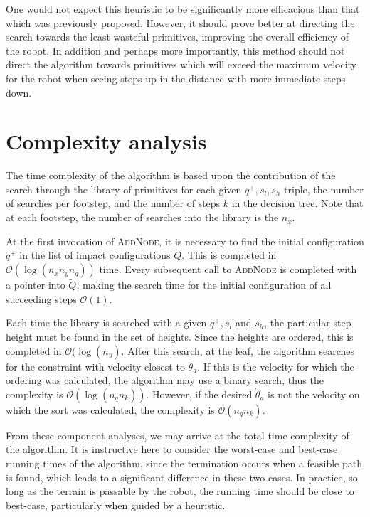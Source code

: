 One would not expect this heuristic to be significantly more efficacious than that which was previously proposed. However, it should prove better at directing the search towards the least wasteful primitives, improving the overall efficiency of the robot. In addition and perhaps more importantly, this method should not direct the algorithm towards primitives which will exceed the maximum velocity for the robot when seeing steps up in the distance with more immediate steps down.

\section{Complexity analysis}
The time complexity of the algorithm is based upon the contribution of the search through the library of primitives for each given $q^+,s_l,s_h$ triple, the number of searches per footstep, and the number of steps $k$ in the decision tree. Note that at each footstep, the number of searches into the library is the $n_x$.

At the first invocation of \textsc{AddNode}, it is necessary to find the initial configuration $q^+$ in the list of impact configurations $\tilde{Q}$. This is completed in $\mathcal{O}(\log(n_xn_yn_q))$ time. Every subsequent call to \textsc{AddNode} is completed with a pointer into $\tilde{Q}$, making the search time for the initial configuration of all succeeding steps $\mathcal{O}(1)$.

Each time the library is searched with a given $q^+,s_l$ and $s_h$, the particular step height must be found in the set of heights. Since the heights are ordered, this is completed in $\mathcal{O}(\log(n_y)$. After this search, at the leaf, the algorithm searches for the constraint with velocity closest to $\dot{\theta}_a$. If this is the velocity for which the ordering was calculated, the algorithm may use a binary search, thus the complexity is $\mathcal{O}(\log(n_qn_k))$. {\color{orange}However, if the desired $\dot{\theta}_a$ is not the velocity on which the sort was calculated, the complexity is $\mathcal{O}(n_qn_k)$.}

From these component analyses, we may arrive at the total time complexity of the algorithm. It is instructive here to consider the worst-case and best-case running times of the algorithm, since the termination occurs when a feasible path is found, which leads to a significant difference in these two cases. In practice, so long as the terrain is passable by the robot, the running time should be close to best-case, particularly when guided by a heuristic.

